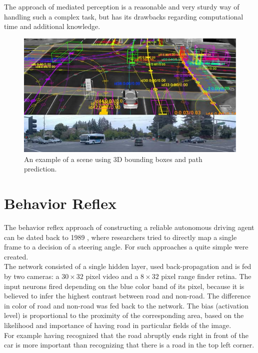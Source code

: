 The approach of mediated perception is a reasonable and very sturdy way of handling such a complex task, but has its drawbacks regarding computational time and additional knowledge.

\begin{figure}
	\centering
	\includegraphics[scale=0.7]{src/pic/intersection.png}
	\caption{An example of a scene using 3D bounding boxes and path prediction.}
	\label{pic: 3D Bounding Box}
\end{figure}

\section{Behavior Reflex}\label{sec: Behavior Reflex}

The behavior reflex approach of constructing a reliable autonomous driving agent can be dated back to 1989 , where researchers tried to directly map a single frame to a decision of a steering angle. For such approaches a quite simple \nn were created. \\
The network \alvinn consisted of a single hidden layer, used back-propagation and is fed by two cameras: a $30\times32$ pixel video and a $8\times32$ pixel range finder retina. The input neurons fired depending on the blue color band of its pixel, because it is believed to infer the highest contrast between road and non-road. The difference in color of road and non-road was fed back to the network. The bias (activation level) is proportional to the proximity of the corresponding area, based on the likelihood and importance of having road in particular fields of the image.\cite{pomerleau1989alvinn}\\
For example having recognized that the road abruptly ends right in front of the car is more important than recognizing that there is a road in the top left corner.\\


